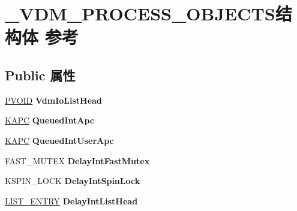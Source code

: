 \hypertarget{struct___v_d_m___p_r_o_c_e_s_s___o_b_j_e_c_t_s}{}\section{\+\_\+\+V\+D\+M\+\_\+\+P\+R\+O\+C\+E\+S\+S\+\_\+\+O\+B\+J\+E\+C\+T\+S结构体 参考}
\label{struct___v_d_m___p_r_o_c_e_s_s___o_b_j_e_c_t_s}
\subsection*{Public 属性}
\begin{DoxyCompactItemize}
\item 
\mbox{\label{struct___v_d_m___p_r_o_c_e_s_s___o_b_j_e_c_t_s_a47beb7335dab463e7786fc80cf63e317}} 
\hyperlink{interfacevoid}{P\+V\+O\+ID} {\bfseries Vdm\+Io\+List\+Head}
\item 
\mbox{\label{struct___v_d_m___p_r_o_c_e_s_s___o_b_j_e_c_t_s_a850b8e212c5c90521d8c1c436179c125}} 
\hyperlink{struct___k_a_p_c}{K\+A\+PC} {\bfseries Queued\+Int\+Apc}
\item 
\mbox{\label{struct___v_d_m___p_r_o_c_e_s_s___o_b_j_e_c_t_s_ad3352acc606d5ea5ebc8b7cd6f9908e9}} 
\hyperlink{struct___k_a_p_c}{K\+A\+PC} {\bfseries Queued\+Int\+User\+Apc}
\item 
\mbox{\label{struct___v_d_m___p_r_o_c_e_s_s___o_b_j_e_c_t_s_a41b9ac25fb5f7e882d8434b54ac7e12d}} 
F\+A\+S\+T\+\_\+\+M\+U\+T\+EX {\bfseries Delay\+Int\+Fast\+Mutex}
\item 
\mbox{\label{struct___v_d_m___p_r_o_c_e_s_s___o_b_j_e_c_t_s_a50a060c870e3dec6a69b428f4d398d38}} 
K\+S\+P\+I\+N\+\_\+\+L\+O\+CK {\bfseries Delay\+Int\+Spin\+Lock}
\item 
\mbox{\label{struct___v_d_m___p_r_o_c_e_s_s___o_b_j_e_c_t_s_a36cd1979c5dfd566bfb8159b16ca2b6c}} 
\hyperlink{struct___l_i_s_t___e_n_t_r_y}{L\+I\+S\+T\+\_\+\+E\+N\+T\+RY} {\bfseries Delay\+Int\+List\+Head}

\end{DoxyCompactItemize}
